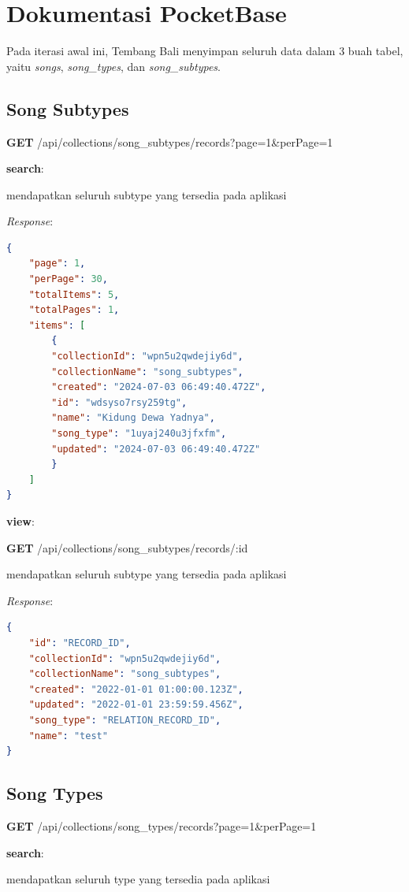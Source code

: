\documentclass[a4paper, 12pt]{article}
\begin{document}
\section{Dokumentasi PocketBase}
Pada iterasi awal ini, Tembang Bali menyimpan seluruh data dalam 3 buah tabel, yaitu \textit{songs}, \textit{song\_types}, dan \textit{song\_subtypes}.

\subsection*{Song Subtypes}
\textbf{GET} /api/collections/song\_subtypes/records?page=1\&perPage=1

\textbf{search}:

\indent mendapatkan seluruh subtype yang tersedia pada aplikasi

\textit{Response}:
\begin{lstlisting}[language=json,firstnumber=1]
{
    "page": 1,
    "perPage": 30,
    "totalItems": 5,
    "totalPages": 1,
    "items": [
        {
        "collectionId": "wpn5u2qwdejiy6d",
        "collectionName": "song_subtypes",
        "created": "2024-07-03 06:49:40.472Z",
        "id": "wdsyso7rsy259tg",
        "name": "Kidung Dewa Yadnya",
        "song_type": "1uyaj240u3jfxfm",
        "updated": "2024-07-03 06:49:40.472Z"
        }
    ]
}
        \end{lstlisting}

\textbf{view}:

\textbf{GET} /api/collections/song\_subtypes/records/:id

\indent mendapatkan seluruh subtype  yang tersedia pada aplikasi

\textit{Response}:
\begin{lstlisting}[language=json,firstnumber=1]
{
    "id": "RECORD_ID",
    "collectionId": "wpn5u2qwdejiy6d",
    "collectionName": "song_subtypes",
    "created": "2022-01-01 01:00:00.123Z",
    "updated": "2022-01-01 23:59:59.456Z",
    "song_type": "RELATION_RECORD_ID",
    "name": "test"
}
\end{lstlisting}

\subsection*{Song Types}
\textbf{GET} /api/collections/song\_types/records?page=1\&perPage=1

\textbf{search}:

\indent mendapatkan seluruh type yang tersedia pada aplikasi
\end{document}
